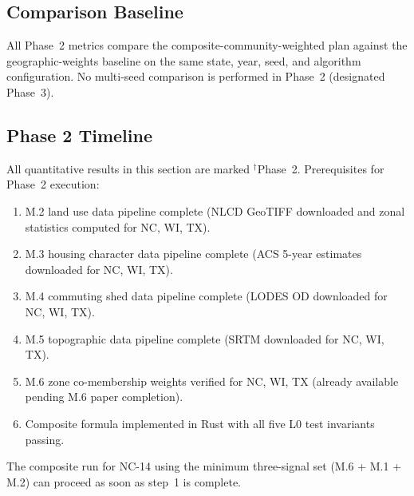 \subsection{Comparison Baseline}

All Phase~2 metrics compare the composite-community-weighted plan against
the geographic-weights baseline on the same state, year, seed, and algorithm
configuration.
No multi-seed comparison is performed in Phase~2 (designated Phase~3).

\subsection{Phase 2 Timeline}

All quantitative results in this section are marked ${}^{\dagger}$Phase~2.
Prerequisites for Phase~2 execution:
\begin{enumerate}
  \item M.2 land use data pipeline complete (NLCD GeoTIFF downloaded and
    zonal statistics computed for NC, WI, TX).
  \item M.3 housing character data pipeline complete (ACS 5-year estimates
    downloaded for NC, WI, TX).
  \item M.4 commuting shed data pipeline complete (LODES OD downloaded
    for NC, WI, TX).
  \item M.5 topographic data pipeline complete (SRTM downloaded for NC, WI, TX).
  \item M.6 zone co-membership weights verified for NC, WI, TX (already
    available pending M.6 paper completion).
  \item Composite formula implemented in Rust with all five L0 test invariants
    passing.
\end{enumerate}
The composite run for NC-14 using the minimum three-signal set (M.6 + M.1 + M.2)
can proceed as soon as step~1 is complete.
